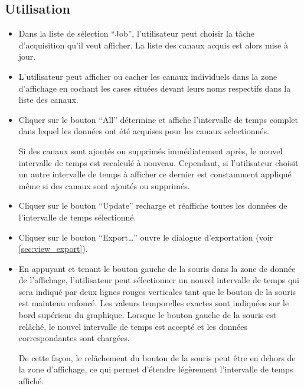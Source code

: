 \documentclass[a4paper,12pt,BCOR6mm,bibtotoc,idxtotoc]{scrbook}
\begin{document}
\subsection{Utilisation}

\begin{itemize}

\item Dans la liste de s\'election ``Job'', l'utilisateur peut choisir
  la t\^ache d'acquisition qu'il veut afficher. La liste des canaux acquis
  est alors mise \`a jour.

\item L'utilisateur peut afficher ou cacher les canaux individuels
  dans la zone d'affichage en cochant les cases situ\'ees devant
  leurs noms respectifs dans la liste des canaux.

\item Cliquer sur le bouton ``All'' d\'etermine et affiche l'intervalle
  de temps complet dans lequel les donn\'ees ont \'et\'e acquises
  pour les canaux selectionn\'es.

  Si des canaux sont ajout\'es ou supprim\'es imm\'ediatement apr\`es,
  le nouvel intervalle de temps est recalcul\'e \`a nouveau.
  Cependant, si l'utilisateur choisit un autre intervalle de temps \`a afficher
  ce dernier est constamment appliqu\'e m\^eme si des canaux sont ajout\'es
  ou supprim\'es.

\item Cliquer sur le bouton ``Update'' recharge et r\'eaffiche toutes
  les donn\'ees de l'intervalle de temps s\'electionn\'e.

\item Cliquer sur le bouton ``Export\ldots'' ouvre le dialogue d'exportation
  (voir \autoref{sec:view_export}).

\item En appuyant et tenant le bouton gauche de la souris dans la zone de
  donn\'ee de l'affichage, l'utilisateur peut s\'electionner un nouvel
  intervalle de temps qui sera indiqu\'e par deux lignes rouges verticales
  tant que le bouton de la souris est maintenu enfonc\'e.
  Les valeurs temporelles exactes sont indiqu\'ees sur le bord sup\'erieur
  du graphique. Lorsque le bouton gauche de la souris est rel\^ach\'e,
  le nouvel intervalle de temps est accept\'e et les donn\'ees correspondantes
  sont charg\'ees.

  De cette fa\c con, le rel\^achement du bouton de la souris peut \^etre
  en dehors de la zone d'affichage, ce qui permet d'\'etendre l\'eg\`erement
  l'intervalle de temps affich\'e.


\end{itemize}
\end{document}
